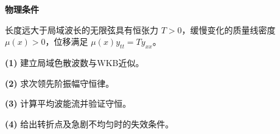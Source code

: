 \textbf{物理条件}\par 长度远大于局域波长的无限弦具有恒张力 \(T>0\)，缓慢变化的质量线密度 \(\mu(x)>0\)，位移满足 \(\mu(x)y_{tt}=Ty_{xx}\)。
\par\noindent\textbf{(1)} 建立局域色散波数与WKB近似。
\par\noindent\textbf{(2)} 求次领先阶振幅守恒律。
\par\noindent\textbf{(3)} 计算平均波能流并验证守恒。
\par\noindent\textbf{(4)} 给出转折点及急剧不均匀时的失效条件。
